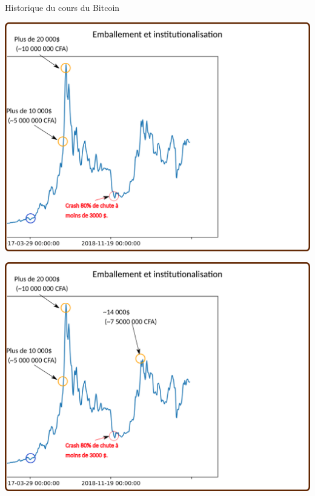 \documentclass[presentation]{beamer}
\begin{document}
\begin{frame}[label={sec:org6ff9387}]{Historique du cours du Bitcoin}
\begin{block}{}
\begin{center}
\includegraphics[width=.95\textwidth]{./Pictures/Timeline/42emballement_crash3.png}
\end{center}
\end{block}

\begin{block}{}
\begin{center}
\includegraphics[width=.95\textwidth]{./Pictures/Timeline/43emballement_rebond.png}
\end{center}
\end{block}


\end{frame}
\end{document}
